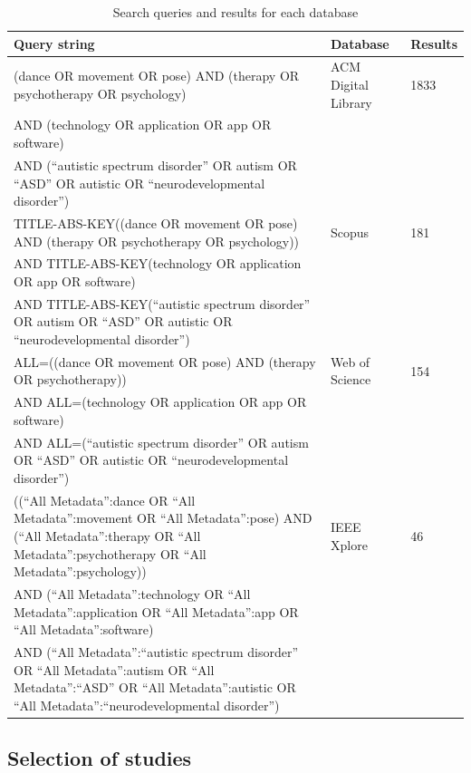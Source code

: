\documentclass[a4paper,fleqn]{cas-sc}
\begin{document}
\begin{table}[h]
\centering
\begin{tabular}{p{}|p{}|p{}}
\hline
\textbf{Query string} & \textbf{Database} & \textbf{Results}\\ [0.5ex] 
 \hline
(dance OR movement OR pose) AND (therapy OR psychotherapy OR psychology)&ACM Digital Library & 1833 \\
AND (technology OR application OR app OR software) &&\\
AND (``autistic spectrum disorder'' OR autism OR ``ASD'' OR autistic OR ``neurodevelopmental disorder'') &&\\
\hline
TITLE-ABS-KEY((dance OR movement OR pose) AND (therapy OR psychotherapy OR psychology)) & Scopus & 181\\
AND TITLE-ABS-KEY(technology OR application OR app OR software) &&\\
AND TITLE-ABS-KEY(``autistic spectrum disorder'' OR autism OR ``ASD'' OR autistic OR ``neurodevelopmental disorder'') &&\\ 
\hline
ALL=((dance OR movement OR pose) AND (therapy OR psychotherapy)) & Web of Science & 154\\
AND ALL=(technology OR application OR app OR software) &&\\
AND ALL=(``autistic spectrum disorder'' OR autism OR ``ASD'' OR autistic OR ``neurodevelopmental disorder'') &&\\ 
\hline
((``All Metadata'':dance OR ``All Metadata'':movement OR ``All Metadata'':pose) AND (``All Metadata'':therapy OR ``All Metadata'':psychotherapy OR ``All Metadata'':psychology)) & IEEE Xplore & 46\\
AND (``All Metadata'':technology OR ``All Metadata'':application OR ``All Metadata'':app OR ``All Metadata'':software) &&\\
AND (``All Metadata'':``autistic spectrum disorder'' OR ``All Metadata'':autism OR ``All Metadata'':``ASD'' OR ``All Metadata'':autistic OR ``All Metadata'':``neurodevelopmental disorder'') &&\\
 
\hline
\end{tabular}
\caption{Search queries and results for each database}
\label{TABLE:db-search}
\end{table}

\subsection{Selection of studies}
\end{document}
